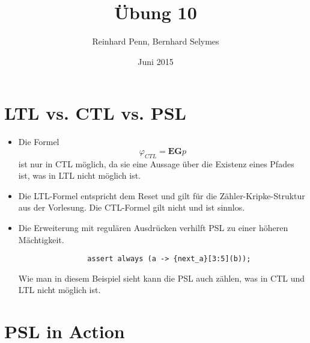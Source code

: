 \documentclass[12pt,a4paper]{article}
\begin{document}
\title{Übung 10}
\author{Reinhard Penn, Bernhard Selymes}
\date{Juni 2015}

\normalsize




\section{LTL vs. CTL vs. PSL}

\begin{itemize}
	\item Die Formel 
		\begin{equation*}
			\varphi_{CTL} = \textbf{EG}\textit{p}
		\end{equation*}
		ist nur in CTL möglich, da sie eine Aussage über die Existenz eines Pfades ist, was in LTL nicht möglich ist.
	\item Die LTL-Formel entspricht dem Reset und gilt für die Zähler-Kripke-Struktur aus der Vorlesung. Die CTL-Formel gilt nicht und ist sinnlos.
	\item Die Erweiterung mit regulären Ausdrücken verhilft PSL zu einer höheren Mächtigkeit.
				\begin{verbatim}
				assert always (a -> {next_a}[3:5](b));
				\end{verbatim}
				Wie man in diesem Beispiel sieht kann die PSL auch zählen, was in CTL und LTL nicht möglich ist.
\end{itemize}

\section{PSL in Action}
	
\end{document}
